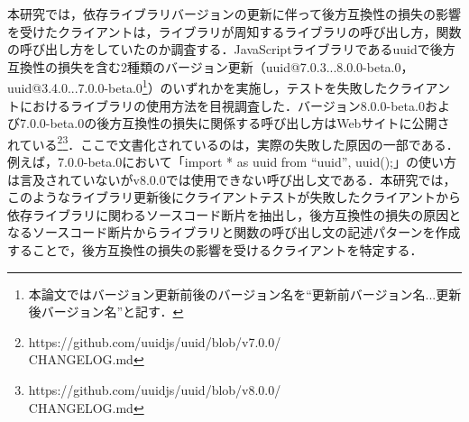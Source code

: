 \documentclass[T,J]{fose} %
\begin{document}
本研究では，依存ライブラリバージョンの更新に伴って後方互換性の損失の影響を受けたクライアントは，ライブラリが周知するライブラリの呼び出し方，関数の呼び出し方をしていたのか調査する．JavaScriptライブラリであるuuidで後方互換性の損失を含む2種類のバージョン更新（uuid@7.0.3...8.0.0-beta.0，uuid@3.4.0...7.0.0-beta.0\footnote{本論文ではバージョン更新前後のバージョン名を``更新前バージョン名...更新後バージョン名''と記す．}）のいずれかを実施し，テストを失敗したクライアントにおけるライブラリの使用方法を目視調査した．バージョン8.0.0-beta.0および7.0.0-beta.0の後方互換性の損失に関係する呼び出し方はWebサイトに公開されている\footnote{https://github.com/uuidjs/uuid/blob/v7.0.0/\\CHANGELOG.md}\footnote{https://github.com/uuidjs/uuid/blob/v8.0.0/\\CHANGELOG.md}．ここで文書化されているのは，実際の失敗した原因の一部である．例えば，7.0.0-beta.0において「import * as uuid from ``uuid'', uuid();」の使い方は言及されていないがv8.0.0では使用できない呼び出し文である．本研究では，このようなライブラリ更新後にクライアントテストが失敗したクライアントから依存ライブラリに関わるソースコード断片を抽出し，後方互換性の損失の原因となるソースコード断片からライブラリと関数の呼び出し文の記述パターンを作成することで，後方互換性の損失の影響を受けるクライアントを特定する．







\end{document}
